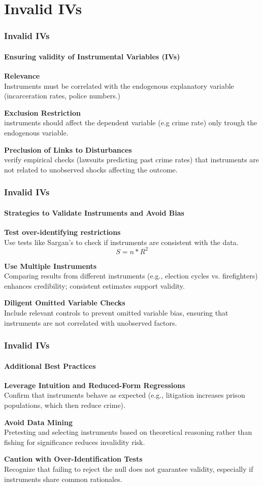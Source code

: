 \documentclass{beamer} %
\theoremstyle{definition}
\begin{document}
\section{Invalid IVs}
\begin{frame}[fragile]
	\frametitle{Invalid IVs}
	\framesubtitle{Ensuring validity of Instrumental Variables (IVs)}
	\textbf{Relevance}\\
	Instruments must be correlated with the endogenous explanatory variable (incarceration rates, police numbers.)
	
	\vspace{1em}
	\textbf{Exclusion Restriction}\\
	instruments should affect the dependent variable (e.g crime rate) only trough the endogenous variable.
	
	\vspace{1em}
	\textbf{Preclusion of Links to Disturbances}\\
	verify empirical checks (lawsuits predicting past crime rates) that instruments are not related to unobserved shocks affecting the outcome.
\end{frame}

\begin{frame}[fragile]
	\frametitle{Invalid IVs}
	\framesubtitle{Strategies to Validate Instruments and Avoid Bias}
	\textbf{Test over-identifying restrictions}\\
	Use tests like Sargan’s to check if instruments are consistent with the data.
	$$ S = n * R^2 $$
	
	\vspace{1em}
	\textbf{Use Multiple Instruments}\\
	Comparing results from different instruments (e.g., election cycles vs. firefighters) enhances credibility; consistent estimates support validity.
	
	\vspace{1em}
	\textbf{Diligent Omitted Variable Checks}\\
	Include relevant controls to prevent omitted variable bias, ensuring that instruments are not correlated with unobserved factors.
\end{frame}
\begin{frame}[fragile]
	\frametitle{Invalid IVs}
	\framesubtitle{Additional Best Practices}
	\textbf{Leverage Intuition and Reduced-Form Regressions}\\
	Confirm that instruments behave as expected (e.g., litigation increases prison populations, which then reduce crime).
	
	\vspace{1em}
	\textbf{Avoid Data Mining}\\
	Pretesting and selecting instruments based on theoretical reasoning rather than fishing for significance reduces invalidity risk.
	
	\vspace{1em}
	\textbf{Caution with Over-Identification Tests}\\
	Recognize that failing to reject the null does not guarantee validity, especially if instruments share common rationales.
\end{frame}
\end{document}
